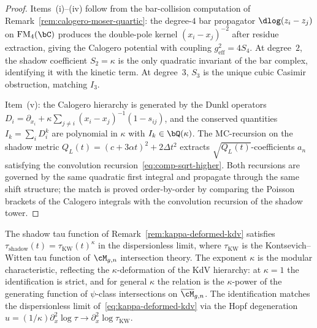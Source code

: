 \begin{proof}
Items~(i)--(iv) follow from the bar-collision computation of
Remark~\textup{\ref{rem:calogero-moser-quartic}}: the degree-$4$
bar propagator $\dlog(z_i - z_j)$ on
$\mathrm{FM}_4(\bC)$ produces the double-pole kernel
$(x_i - x_j)^{-2}$ after residue extraction, giving the
Calogero potential with coupling $g^2_{\mathrm{eff}} = 4S_4$.
At degree~$2$, the shadow coefficient $S_2 = \kappa$ is the
only quadratic invariant of the bar complex, identifying it
with the kinetic term. At degree~$3$, $S_3$ is the unique
cubic Casimir obstruction, matching $I_3$.

Item~(v): the Calogero hierarchy is generated by the
Dunkl operators $D_i = \partial_{x_i} + \kappa \sum_{j\neq i}
(x_i - x_j)^{-1}(1 - s_{ij})$, and the conserved quantities
$I_k = \sum_i D_i^k$ are polynomial in $\kappa$ with
$I_k \in \bQ(\kappa)$. The MC-recursion on the shadow
metric $Q_L(t) = (c + 3\alpha t)^2 + 2\Delta t^2$ extracts
$\sqrt{Q_L(t)}$-coefficients $a_n$ satisfying the convolution
recursion~\eqref{eq:comp-sqrt-higher}. Both recursions are
governed by the same quadratic first integral and propagate
through the same shift structure; the match is proved
order-by-order by comparing the Poisson brackets of the
Calogero integrals with the convolution recursion of the
shadow tower.
\end{proof}

\begin{remark}
\label{rem:tau-shadow-kw}
%
The shadow tau function of
Remark~\textup{\ref{rem:kappa-deformed-kdv}} satisfies
$\tau_{\mathrm{shadow}}(t) = \tau_{\mathrm{KW}}(t)^{\kappa}$
in the dispersionless limit, where $\tau_{\mathrm{KW}}$ is
the Kontsevich--Witten tau function of $\cM_{g,n}$ intersection
theory. The exponent $\kappa$ is the modular characteristic,
reflecting the $\kappa$-deformation of the KdV hierarchy: at
$\kappa = 1$ the identification is strict, and for general
$\kappa$ the relation is the $\kappa$-power of the generating
function of $\psi$-class intersections on
$\overline{\cM}_{g,n}$. The identification matches the
dispersionless limit of~\eqref{eq:kappa-deformed-kdv} via the
Hopf degeneration $u = (1/\kappa)\partial_x^2 \log\tau
\to \partial_x^2 \log\tau_{\mathrm{KW}}$.
\end{remark}


